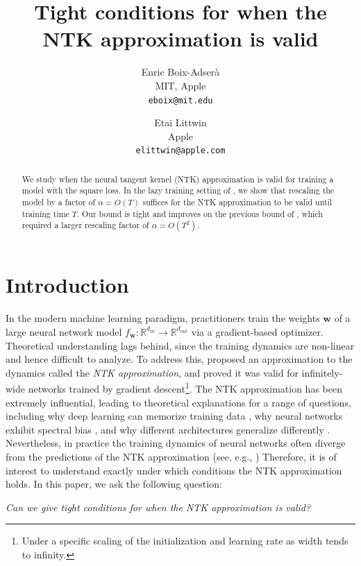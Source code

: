 \documentclass[11pt]{article} %
\title{Tight conditions for when the NTK approximation is valid}
\author{Enric Boix-Adser\`a \\ MIT, Apple \\ \texttt{eboix@mit.edu} \and Etai Littwin \\ Apple \\ \texttt{elittwin@apple.com}
      }
\newcommand{\R}{\mathbb{R}}
\newcommand{\<}{\langle}
\renewcommand{\>}{\rangle}
\def\bw{{\boldsymbol w}}
\theoremstyle{plain}
\theoremstyle{definition}
\theoremstyle{remark}
\begin{document}
\maketitle

\begin{abstract}
We study when the neural tangent kernel (NTK) approximation is valid for training a model with the square loss. In the lazy training setting of \cite{chizat2019lazy}, we show that rescaling the model by a factor of $\alpha = O(T)$ suffices for the NTK approximation to be valid until training time $T$. Our bound is tight and improves on the previous bound of \cite{chizat2019lazy}, which required a larger rescaling factor of $\alpha = O(T^2)$.
\end{abstract}

\section{Introduction}

In the modern machine learning paradigm, practitioners train the weights $\bw$ of a large neural network model $f_{\bw} : \R^{d_{in}} \to \R^{d_{out}}$ via a gradient-based optimizer. Theoretical understanding lags behind, since the training dynamics are non-linear and hence difficult to analyze. To address this, \cite{jacot2018neural} proposed an approximation to the dynamics called the \textit{NTK approximation}, and proved it was valid for infinitely-wide networks trained by gradient descent\footnote{Under a specific scaling of the initialization and learning rate as width tends to infinity.}. The NTK approximation has been extremely influential, leading to theoretical explanations for a range of questions, including why deep learning can memorize training data 
\citep{du2018gradient,du2019gradient,allen2019learning,allen2019convergence,arora19fine,yuan2019generalization,lee2019wide}, why neural networks exhibit spectral bias \citep{cao2019towards,basri2020frequency,canatar2021spectral}, and why different architectures generalize differently 
\citep{bietti2019inductive,mei2021learning,wang2021eigenvector}. Nevertheless, in practice the training dynamics of neural networks often diverge from the predictions of the NTK approximation (see, e.g., \cite{arora2019exact}) Therefore, it is of interest to understand exactly under which conditions the NTK approximation holds. In this paper, we ask the following question:
\begin{center}
    \textit{Can we give tight conditions for when the NTK approximation is valid?}
\end{center}
\end{document}
